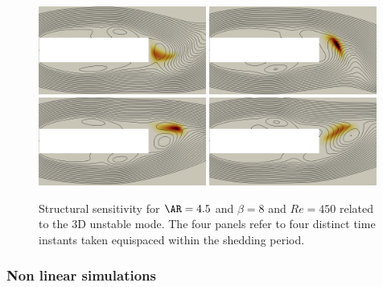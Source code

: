 \begin{figure}
  \centering
  \includegraphics[width=0.49\textwidth]{./fig/AR4p5/sens3D_25.png}
  \includegraphics[width=0.49\textwidth]{./fig/AR4p5/sens3D_50.png}
  \includegraphics[width=0.49\textwidth]{./fig/AR4p5/sens3D_75.png}
  \includegraphics[width=0.49\textwidth]{./fig/AR4p5/sens3D_100.png}
  \caption{Structural sensitivity for $\AR=4.5$ and $\beta=8$ and $Re=450$ related to the 3D unstable mode. The four panels refer to four distinct time instants taken equispaced within the shedding period.}
  \label{fig:ss3d}
\end{figure}

\subsubsection{Non linear simulations}

